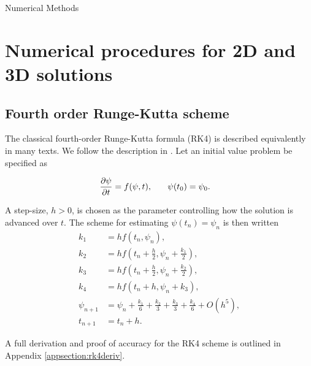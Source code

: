 \begin{chapter}{\label{cha:numerics}Numerical Methods}
\section{\label{section:RK} Numerical procedures for 2D and 3D solutions}
	\subsection{\label{section:RK4} Fourth order Runge-Kutta scheme}
	The classical fourth-order Runge-Kutta formula (RK4) is described equivalently in many texts. We follow the description in \cite{NumericalRecipes}. Let an initial value problem be specified as
	
	\begin{align*}
		\frac{\partial \psi}{\partial t} &= f(\psi,t),\hspace{0.25in}\psi(t_0) = \psi_0.
	\end{align*}

A step-size, $h>0$, is chosen as the parameter controlling how the solution is advanced over $t$. The scheme for estimating $\psi(t_n)= \psi_n$ is then written
\begin{equation}
\begin{split}
		k_1 &= hf(t_n,\psi_n),\\
		k_2 &= hf(t_n+\frac{h}{2},\psi_n+\frac{k_1}{2}),\\
		k_3 &= hf(t_n+\frac{h}{2},\psi_n+\frac{k_2}{2}),\\
		k_4 &= hf(t_n+h,\psi_n+k_3),\\
		\psi_{n+1} &= \psi_n + \frac{k_1}{6}+ \frac{k_2}{3}+ \frac{k_3}{3} + \frac{k_4}{6} + O(h^5),\\
		t_{n+1}  &= t_n + h.
		\label{eq:rk4}
\end{split}
\end{equation}


	A full derivation and proof of accuracy for the RK4 scheme is outlined in Appendix \ref{appsection:rk4deriv}.
	\begin{algorithm}[H]
		\BlankLine
\end{algorithm}
\end{chapter}
